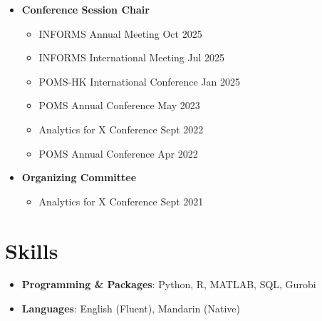 \documentclass[12pt, a4paper]{article}
\begin{document}
{\begin{itemize}
	\item[] \textbf{Conference Session Chair}
	\begin{itemize}
		\item INFORMS Annual Meeting \hfill Oct 2025
		\item INFORMS International Meeting \hfill Jul 2025
		\item POMS-HK International Conference \hfill Jan 2025
		\item POMS Annual Conference \hfill May 2023
		\item Analytics for X Conference \hfill Sept 2022
		\item POMS Annual Conference \hfill Apr 2022
	\end{itemize}

	\item[] \textbf{Organizing Committee}
	\begin{itemize}
		\item Analytics for X Conference \hfill Sept 2021
	\end{itemize}


\end{itemize}




\section*{Skills}

\begin{itemize}
	\item[] \textbf{Programming \& Packages}: Python, R, MATLAB, SQL, Gurobi
	\item[] \textbf{Languages}: English (Fluent), Mandarin (Native)
\end{itemize}


}
\end{document}
